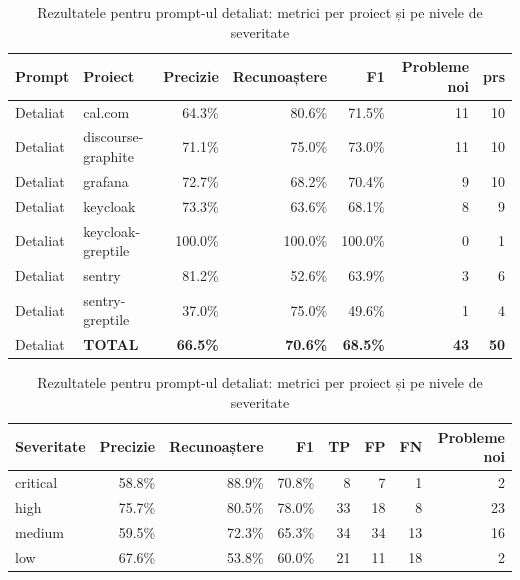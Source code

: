 \documentclass[12pt, a4paper, oneside, romanian]{teza-upb}
\begin{document}
    \begin{table}[H]
      \centering
      \scriptsize
      \setlength{\tabcolsep}{6pt}
      \renewcommand{\arraystretch}{1.3}

      \begin{subtable}[t]{\linewidth}
        \centering
        \begin{tabular}{@{}llrrrrr@{}}
          \toprule
          \textbf{Prompt} & \textbf{Proiect} & \textbf{Precizie} & \textbf{Recunoaștere} & \textbf{F1} & \textbf{Probleme noi} & \textbf{\ac{pr}}s \\
          \midrule
          Detaliat & cal.com            & 64.3\%  & 80.6\%  & 71.5\%  & 11 & 10 \\
          Detaliat & discourse-graphite & 71.1\%  & 75.0\%  & 73.0\%  & 11 & 10 \\
          Detaliat & grafana            & 72.7\%  & 68.2\%  & 70.4\%  &  9 & 10 \\
          Detaliat & keycloak           & 73.3\%  & 63.6\%  & 68.1\%  &  8 &  9 \\
          Detaliat & keycloak-greptile  & 100.0\% & 100.0\% & 100.0\% &  0 &  1 \\
          Detaliat & sentry             & 81.2\%  & 52.6\%  & 63.9\%  &  3 &  6 \\
          Detaliat & sentry-greptile    & 37.0\%  & 75.0\%  & 49.6\%  &  1 &  4 \\
          \midrule
          Detaliat & \textbf{TOTAL}     & \textbf{66.5\%} & \textbf{70.6\%} & \textbf{68.5\%} & \textbf{43} & \textbf{50} \\
          \bottomrule
        \end{tabular}
        \caption{Metrici per proiect}
      \end{subtable}

      \vspace{4mm}

      \begin{subtable}[t]{\linewidth}
        \centering
        \begin{tabular}{@{}lrrrrrrr@{}}
          \toprule
          \textbf{Severitate} & \textbf{Precizie} & \textbf{Recunoaștere} & \textbf{F1} & \textbf{TP} & \textbf{FP} & \textbf{FN} & \textbf{Probleme noi} \\
          \midrule
          critical & 58.8\% & 88.9\% & 70.8\% &  8 &  7 &  1 &  2 \\
          high     & 75.7\% & 80.5\% & 78.0\% & 33 & 18 &  8 & 23 \\
          medium   & 59.5\% & 72.3\% & 65.3\% & 34 & 34 & 13 & 16 \\
          low      & 67.6\% & 53.8\% & 60.0\% & 21 & 11 & 18 &  2 \\
          \bottomrule
        \end{tabular}
        \caption{Metrici pe nivele de severitate}
      \end{subtable}

      \vspace{2mm}
      \caption{Rezultatele pentru prompt-ul detaliat: metrici per proiect și pe nivele de severitate}
      \label{tab:detailed}
    \end{table}
\end{document}
